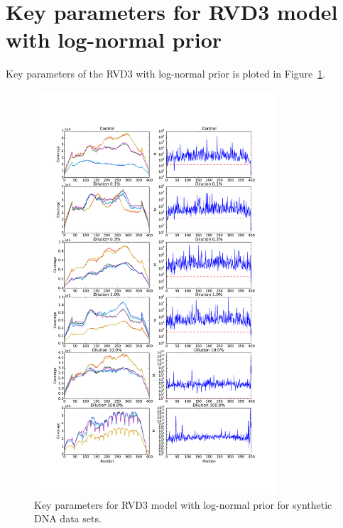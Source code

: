 \documentclass[11pt,reqno]{amsart}
\begin{document}

\section{Key parameters for RVD3 model with log-normal prior}\label{sec:appendix_parameters}
Key parameters of the RVD3 with log-normal prior is ploted in Figure~\ref{fig:M_lognormal}.

\begin{figure}[htbp]
\begin{center}
\includegraphics[width=90mm]{figs/M_lognormal.pdf}
\caption{Key parameters for RVD3 model with log-normal prior for synthetic DNA data sets.}
\label{fig:M_lognormal}
\end{center}
\end{figure}



\end{document}
